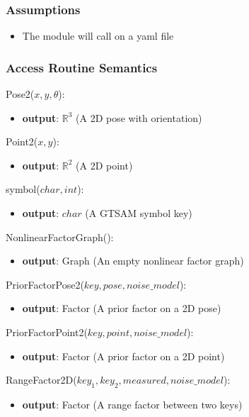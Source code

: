\documentclass[12pt, titlepage]{article}
\begin{document}
\subsubsection{Assumptions}
\begin{itemize}
  \item The module will call on a yaml file
\end{itemize}

\subsubsection{Access Routine Semantics}

Pose2($x, y, \theta$):
\begin{itemize}
    \item \textbf{output}: $ \mathbb{R}^3 $ (A 2D pose with orientation)
\end{itemize}

\noindent Point2($x, y$):
\begin{itemize}
    \item \textbf{output}: $ \mathbb{R}^2 $ (A 2D point)
\end{itemize}

\noindent symbol($char, int$):
\begin{itemize}
    \item \textbf{output}: $char$ (A GTSAM symbol key)
\end{itemize}

\noindent NonlinearFactorGraph():
\begin{itemize}
    \item \textbf{output}: Graph (An empty nonlinear factor graph)
\end{itemize}

\noindent PriorFactorPose2($key, pose, noise\_model$):
\begin{itemize}
    \item \textbf{output}: Factor (A prior factor on a 2D pose)
\end{itemize}

\noindent PriorFactorPoint2($key, point, noise\_model$):
\begin{itemize}
    \item \textbf{output}: Factor (A prior factor on a 2D point)
\end{itemize}

\noindent RangeFactor2D($key_1, key_2, measured, noise\_model$):
\begin{itemize}
    \item \textbf{output}: Factor (A range factor between two keys)
\end{itemize}
\end{document}
